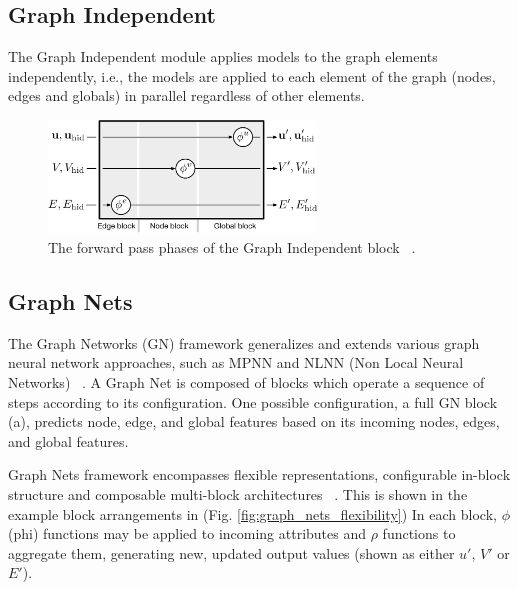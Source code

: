 \subsection{Graph Independent}

The Graph Independent module applies models to the graph elements independently, i.e., the models are applied to each element of the graph (nodes, edges and globals) in parallel regardless of other elements.

\begin{figure}[!htb]
    \centering
    \includegraphics[height=3.0cm]{fig/content/graph_nets/blocks/independent.pdf}
    \caption{The forward pass phases of the Graph Independent block ~\cite{Battaglia_2018}.}
\end{figure}

\subsection{Graph Nets}

The Graph Networks (GN) framework generalizes and extends various graph neural network approaches, such as MPNN and NLNN (Non Local Neural Networks) ~\cite{Battaglia_2018}. A Graph Net is composed of blocks which operate a sequence of steps according to its configuration. One possible configuration, a full GN block (a), predicts node, edge, and global features based on its incoming nodes, edges, and global features.

Graph Nets framework encompasses flexible representations, configurable in-block structure and composable multi-block architectures ~\cite{Battaglia_2018}. This is shown in the example block arrangements in (Fig. \ref{fig:graph_nets_flexibility}) In each block, $\phi$ (phi) functions may be applied to incoming attributes and $\rho$ functions to aggregate them, generating new, updated output values (shown as either $u'$, $V'$ or $E'$).

